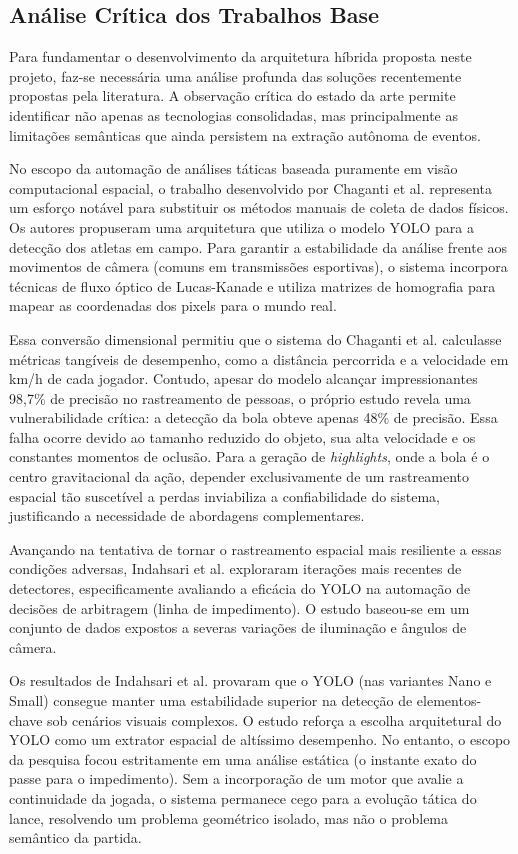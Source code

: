 \documentclass[a4paper,10pt, twocolumn]{article}
\begin{document}
\subsection{Análise Crítica dos Trabalhos Base}

Para fundamentar o desenvolvimento da arquitetura híbrida proposta neste projeto, faz-se necessária uma análise profunda das soluções recentemente propostas pela literatura. A observação crítica do estado da arte permite identificar não apenas as tecnologias consolidadas, mas principalmente as limitações semânticas que ainda persistem na extração autônoma de eventos.

No escopo da automação de análises táticas baseada puramente em visão computacional espacial, o trabalho desenvolvido por Chaganti et al. \cite{chaganti2024advanced} representa um esforço notável para substituir os métodos manuais de coleta de dados físicos. Os autores propuseram uma arquitetura que utiliza o modelo YOLO para a detecção dos atletas em campo. Para garantir a estabilidade da análise frente aos movimentos de câmera (comuns em transmissões esportivas), o sistema incorpora técnicas de fluxo óptico de Lucas-Kanade e utiliza matrizes de homografia para mapear as coordenadas dos pixels para o mundo real. 

Essa conversão dimensional permitiu que o sistema do Chaganti et al. calculasse métricas tangíveis de desempenho, como a distância percorrida e a velocidade em km/h de cada jogador. Contudo, apesar do modelo alcançar impressionantes 98,7\% de precisão no rastreamento de pessoas, o próprio estudo revela uma vulnerabilidade crítica: a detecção da bola obteve apenas 48\% de precisão. Essa falha ocorre devido ao tamanho reduzido do objeto, sua alta velocidade e os constantes momentos de oclusão. Para a geração de \textit{highlights}, onde a bola é o centro gravitacional da ação, depender exclusivamente de um rastreamento espacial tão suscetível a perdas inviabiliza a confiabilidade do sistema, justificando a necessidade de abordagens complementares.

Avançando na tentativa de tornar o rastreamento espacial mais resiliente a essas condições adversas, Indahsari et al. \cite{indahsari2025implementation} exploraram iterações mais recentes de detectores, especificamente avaliando a eficácia do YOLO na automação de decisões de arbitragem (linha de impedimento). O estudo baseou-se em um conjunto de dados expostos a severas variações de iluminação e ângulos de câmera. 

Os resultados de Indahsari et al. provaram que o YOLO (nas variantes Nano e Small) consegue manter uma estabilidade superior na detecção de elementos-chave sob cenários visuais complexos. O estudo reforça a escolha arquitetural do YOLO como um extrator espacial de altíssimo desempenho. No entanto, o escopo da pesquisa focou estritamente em uma análise estática (o instante exato do passe para o impedimento). Sem a incorporação de um motor que avalie a continuidade da jogada, o sistema permanece cego para a evolução tática do lance, resolvendo um problema geométrico isolado, mas não o problema semântico da partida.
\end{document}
